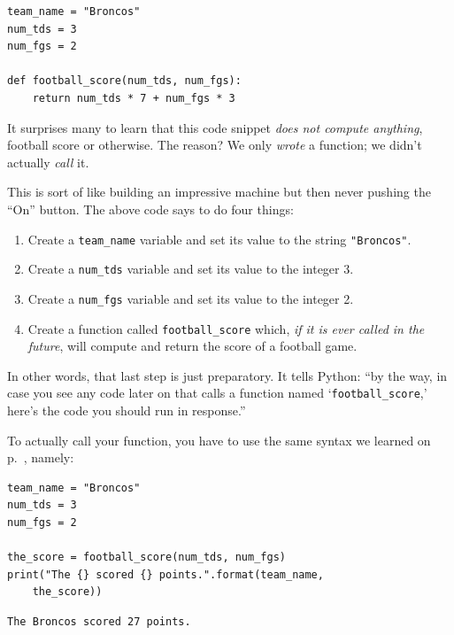 \begin{Verbatim}[fontsize=\small,samepage=true,frame=single,framesep=3mm]
team_name = "Broncos"
num_tds = 3
num_fgs = 2

def football_score(num_tds, num_fgs):
    return num_tds * 7 + num_fgs * 3
\end{Verbatim}

It surprises many to learn that this code snippet \textit{does not compute
anything}, football score or otherwise. The reason? We only \textit{wrote} a
function; we didn't actually \textit{call} it.

This is sort of like building an impressive machine but then never pushing the
``On'' button. The above code says to do four things:

\begin{enumerate}[nosep]
\item Create a \texttt{team\_name} variable and set its value to the string
\texttt{"Broncos"}.
\item Create a \texttt{num\_tds} variable and set its value to the integer 3.
\item Create a \texttt{num\_fgs} variable and set its value to the integer 2.
\item Create a function called \texttt{football\_score} which, \textit{if it is
ever called in the future}, will compute and return the score of a football
game.
\end{enumerate}

In other words, that last step is just preparatory. It tells Python: ``by the
way, in case you see any code later on that calls a function named
`\texttt{football\_score},' here's the code you should run in response.''

To actually call your function, you have to use the same syntax we learned on
p.~\pageref{function}, namely:

\begin{Verbatim}[fontsize=\small,samepage=true,frame=single,framesep=3mm]
team_name = "Broncos"
num_tds = 3
num_fgs = 2

the_score = football_score(num_tds, num_fgs)
print("The {} scored {} points.".format(team_name,
    the_score))
\end{Verbatim}
\vspace{-.2in}

\begin{Verbatim}[fontsize=\small,samepage=true,frame=leftline,framesep=5mm,framerule=1mm]
The Broncos scored 27 points.
\end{Verbatim}

